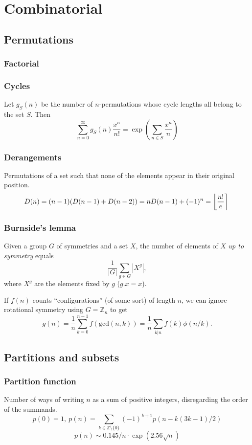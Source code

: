 \chapter{Combinatorial}

\section{Permutations}
	\subsection{Factorial}

	\subsection{Cycles}
		Let $g_S(n)$ be the number of $n$-permutations whose cycle lengths all belong to the set $S$. Then
		$$\sum_{n=0} ^\infty g_S(n) \frac{x^n}{n!} = \exp\left(\sum_{n\in S} \frac{x^n} {n} \right)$$

	\subsection{Derangements}
		Permutations of a set such that none of the elements appear in their original position.
		\[ \mkern-2mu D(n) = (n-1)(D(n-1)+D(n-2)) = n D(n-1)+(-1)^n = \left\lfloor\frac{n!}{e}\right\rceil \]

	\subsection{Burnside's lemma}
		Given a group $G$ of symmetries and a set $X$, the number of elements of $X$ \emph{up to symmetry} equals
		 \[ {\frac {1}{|G|}}\sum _{{g\in G}}|X^{g}|, \]
		 where $X^{g}$ are the elements fixed by $g$ ($g.x = x$).

		 If $f(n)$ counts ``configurations'' (of some sort) of length $n$, we can ignore rotational symmetry using $G = \mathbb Z_n$ to get
		 \[ g(n) = \frac 1 n \sum_{k=0}^{n-1}{f(\text{gcd}(n, k))} = \frac 1 n \sum_{k|n}{f(k)\phi(n/k)}. \]

\section{Partitions and subsets}
	\subsection{Partition function}
		Number of ways of writing $n$ as a sum of positive integers, disregarding the order of the summands.
		\[ p(0) = 1,\ p(n) = \sum_{k \in \mathbb Z \setminus \{0\}}{(-1)^{k+1} p(n - k(3k-1) / 2)} \]
		\[ p(n) \sim 0.145 / n \cdot \exp(2.56 \sqrt{n}) \]

